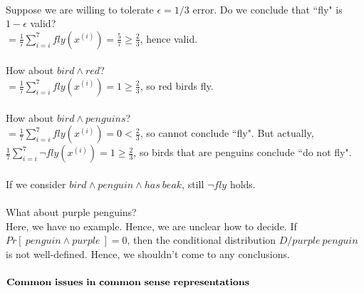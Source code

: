 \documentclass[10pt]{article}
\begin{document}
\\
Suppose we are willing to tolerate $\epsilon = 1/3$ error. Do we conclude that ``fly" is $1-\epsilon$ valid?\\
$=\frac{1}{7}\sum_{i=i}^{7}fly(x^{(i)}) = \frac{5}{7}\ge\frac{2}{3}$, hence valid.\\
\\
How about $bird \land red$?\\
$=\frac{1}{7}\sum_{i=i}^{7}fly(x^{(i)}) = 1 \ge\frac{2}{3}$, so red birds fly.\\
\\
How about $bird \land penguins$?\\
$=\frac{1}{7}\sum_{i=i}^{7}fly(x^{(i)}) = 0 <\frac{2}{3}$, so cannot conclude ``fly". But actually, 
$\frac{1}{7}\sum_{i=i}^{7}\neg fly(x^{(i)}) = 1 \ge\frac{2}{3}$, so birds that are penguins conclude ``do not fly".\\
\\
If we consider $bird \land penguin \land has\ beak$, still $\neg fly$ holds.\\
\\
What about purple penguins?\\
Here, we have no example. Hence, we are unclear how to decide. If $Pr[\ penguin\land purple\ ]= 0$, then the conditional distribution $D/purple\ penguin$ is not well-defined. Hence, we shouldn't come to any conclusions.\\
\\
$\bf{Common\ issues\ in\ common\ sense\ representations}$
\\
\end{document}
